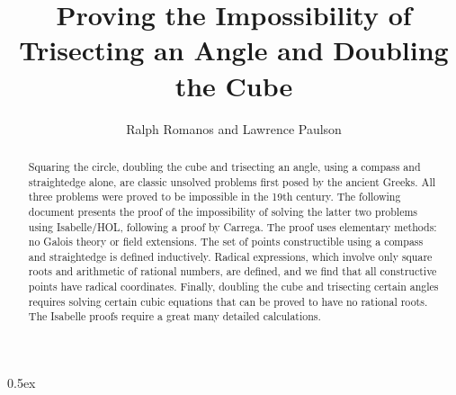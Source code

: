\documentclass[11pt,a4paper]{article}
\begin{document}
\title{Proving the Impossibility of Trisecting an Angle and Doubling the Cube}
\author{Ralph Romanos and Lawrence Paulson}
\maketitle

\begin{abstract}
Squaring the circle, doubling the cube and trisecting an angle, using a compass and 
straightedge alone, are classic unsolved problems first posed by the ancient Greeks. 
All three problems were proved to be impossible in the 19th century. The following document 
presents the proof of the impossibility of solving the latter two problems using Isabelle/HOL, 
following a proof by Carrega. The proof uses elementary methods: no Galois theory or field 
extensions. 
The set of points constructible using a compass and straightedge is defined inductively. 
Radical expressions, which involve only square roots and arithmetic of rational numbers, 
are defined, and we find that all constructive points have radical coordinates. Finally, 
doubling the cube and trisecting certain angles requires solving certain cubic equations 
that can be proved to have no rational roots. The Isabelle proofs require a great many 
detailed calculations.
\end{abstract}

\tableofcontents

\parindent 0pt\parskip 0.5ex



%
%
\end{document}
